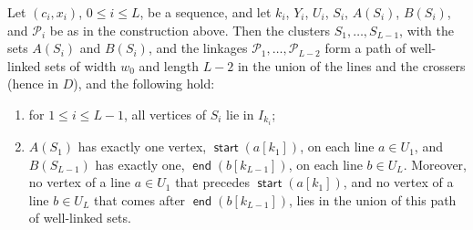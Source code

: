 \documentclass[fontsize=12pt,leading=14pt]{fullpaper}
\DeclareMathOperator{\st}{\mathsf{start}}
\DeclareMathOperator{\en}{\mathsf{end}}
\newcommand{\Pcal}{\mathcal{P}}
\begin{document}
\begin{lemma}\label{lem:seqpath}
  Let $(c_i,x_i)$, $0\le i\le L$, be a sequence, and let $k_i$, $Y_i$, $U_i$, $S_i$, $A(S_i)$, $B(S_i)$, and $\Pcal_i$ be as in the construction above.
  Then the clusters $S_1,\dots,S_{L-1}$, with the sets $A(S_i)$ and $B(S_i)$, and the linkages $\Pcal_1,\dots,\Pcal_{L-2}$ form a path of well-linked sets of width $w_0$ and length $L-2$ in the union of the lines and the crossers (hence in $D$), and the following hold:
  \begin{enumerate}[label=\textnormal{(\roman*)}]
    \item\label{item:seq-window} for $1\le i\le L-1$, all vertices of $S_i$ lie in $I_{k_i}$;
    \item\label{item:seq-ends} $A(S_1)$ has exactly one vertex, $\st(a[k_1])$, on each line $a\in U_1$, and $B(S_{L-1})$ has exactly one, $\en(b[k_{L-1}])$, on each line $b\in U_L$.
      Moreover, no vertex of a line $a\in U_1$ that precedes $\st(a[k_1])$, and no vertex of a line $b\in U_L$ that comes after $\en(b[k_{L-1}])$, lies in the union of this path of well-linked sets.
  \end{enumerate}
\end{lemma}
\end{document}
